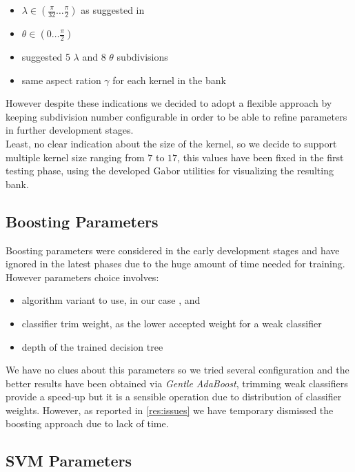 \begin{itemize}
\item $\lambda \in ( \frac{\pi}{32} \ldots \frac{\pi}{2} ) $ as suggested in \cite{Lades93distortioninvariant}
\item $\theta \in ( 0 \ldots \frac{\pi}{2} )$
\item suggested 5 $\lambda$ and 8 $\theta$ subdivisions
\item same aspect ration $\gamma$ for each kernel in the bank
\end{itemize}

However despite these indications we decided to adopt a flexible approach by keeping subdivision number configurable in order to be able to refine parameters in further development stages. \\
Least, no clear indication about the size of the kernel, so we decide to support multiple kernel size ranging from $7$ to $17$, this values have been fixed in the first testing phase, using the developed Gabor utilities for visualizing the resulting bank. 

\subsection{Boosting Parameters}

Boosting parameters were considered in the early development stages and have ignored in the latest phases due to the huge amount of time needed for  training. However parameters choice involves:

\begin{itemize}
\item algorithm variant to use, in our case ,  and  
\item classifier trim weight, as the lower accepted weight for a weak classifier
\item depth of the trained decision tree
\end{itemize}

We have no clues about this parameters so we tried several configuration and the better results have been obtained via \emph{Gentle AdaBoost}, trimming weak classifiers provide a speed-up but it is a sensible operation due to distribution of classifier weights. However, as reported in \ref{res:issues} we have temporary dismissed the boosting approach due to lack of time.

\subsection{SVM Parameters}

